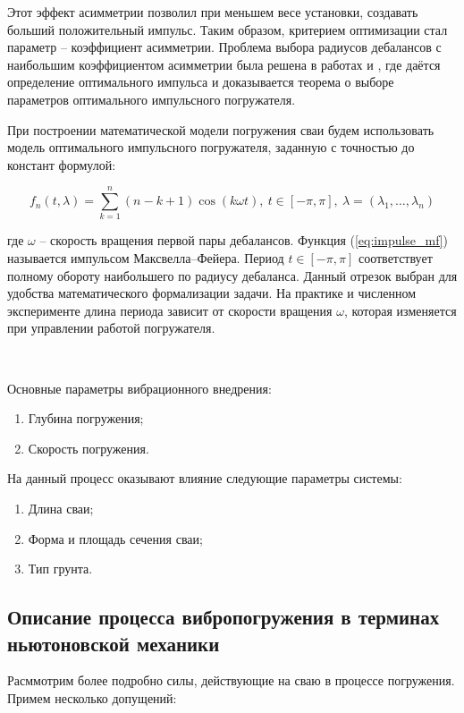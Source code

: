 Этот эффект асимметрии позволил при меньшем весе установки, создавать больший положительный импульс. Таким образом,
критерием оптимизации стал параметр – коэффициент асимметрии. Проблема выбора радиусов дебалансов с наибольшим
коэффициентом асимметрии была решена в работах \cite{kostin_va} и \cite{kostin_dv}, где даётся определение оптимального
импульса и доказывается теорема о выборе параметров оптимального импульсного погружателя.

При построении математической модели погружения сваи будем использовать модель оптимального импульсного погружателя,
заданную с точностью до констант формулой:

\begin{equation}
    \label{eq:impulse_mf}
    f_n(t, \lambda) = \sum\limits_{k = 1}^n (n-k+1) \cos(k \omega t),\ t \in [-\pi, \pi],\ \lambda =(\lambda_1, \ldots,\lambda_n)
\end{equation}

\noindent где $\omega$ -- скорость вращения первой пары дебалансов. Функция (\ref{eq:impulse_mf}) называется импульсом Максвелла–Фейера.
Период $t \in [-\pi, \pi]$ соответствует полному обороту наибольшего по радиусу дебаланса. Данный отрезок выбран для удобства
математического формализации задачи. На практике и численном эксперименте длина периода зависит от скорости вращения $\omega$, которая
изменяется при управлении работой погружателя.

~\

\noindent Основные параметры вибрационного внедрения:
\begin{enumerate}
    \item Глубина погружения;
    \item Скорость погружения.
\end{enumerate}
На данный процесс оказывают влияние следующие параметры системы:
\begin{enumerate}
    \item Длина сваи;
    \item Форма и площадь сечения сваи;
    \item Тип грунта.
\end{enumerate}

\subsection{Описание процесса вибропогружения в терминах ньютоновской механики}
\label{chapter:newton}

Расммотрим более подробно силы, действующие на сваю в процессе погружения. Примем несколько допущений:

